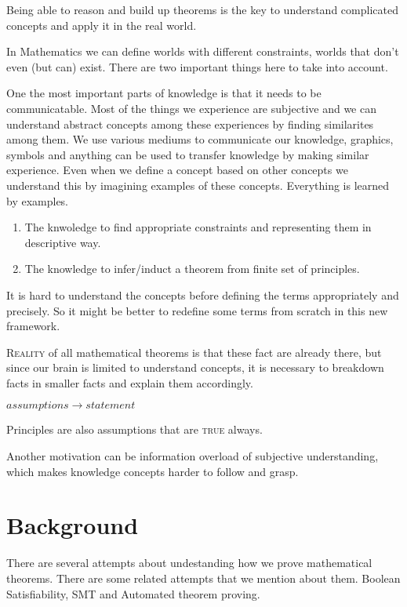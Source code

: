 \documentclass{article}
\begin{document}
Being able to reason and build up theorems is the key to understand complicated concepts and apply it in the real world. 

In Mathematics we can define worlds with different constraints, worlds that don't even (but can) exist. There are two important things here to take into account. 


One the most important parts of knowledge is that it needs to be communicatable. Most of the things we experience are subjective and we can understand abstract concepts among these experiences by finding similarites among them. We use various mediums to communicate our knowledge, graphics, symbols and anything can be used to transfer knowledge by making similar experience. Even when we define a concept based on other concepts we understand this by imagining examples of these concepts. Everything is learned by examples.

\begin{enumerate}
\item The knwoledge to find appropriate constraints and representing them in descriptive way.
\item The knowledge to infer/induct a theorem from finite set of principles.
\end{enumerate}


It is hard to understand the concepts before defining the terms appropriately and precisely. So it might be better to redefine some terms from scratch in this new framework.


\textsc{Reality} of all mathematical theorems is that these fact are already there, but since our brain is limited to understand concepts, it is necessary to breakdown facts in smaller facts and explain them accordingly.



\begin{center}\(assumptions \rightarrow statement\)\end{center}

Principles are also assumptions that are \textsc{true} always.


Another motivation can be information overload of subjective understanding, which makes knowledge concepts harder to follow and grasp.



\section{Background}

There are several attempts about undestanding how we prove mathematical theorems. There are some related attempts that we mention about them. Boolean Satisfiability, SMT and Automated theorem proving.
\end{document}
